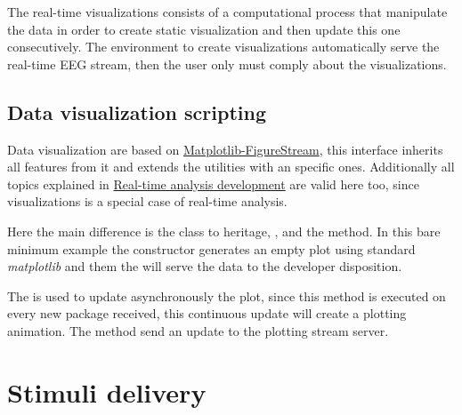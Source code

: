 

The real-time visualizations consists of a computational process that manipulate the data in order to create static visualization and then update this one consecutively. The environment to create visualizations automatically serve the real-time EEG stream, then the user only must comply about the visualizations.


\subsection{Data visualization scripting}\label{ch4:viz_development}%

Data visualization are based on \hyperref[appendix:matplotlib-figurestream]{Matplotlib-FigureStream}, this interface inherits all features from it and extends the utilities with an specific ones. Additionally all topics explained in \hyperref[ch4:data\_analysis]{Real-time analysis development} are valid here too, since visualizations is a special case of real-time analysis.



Here the main difference is the class to heritage, , and the  method. In this bare minimum example the constructor generates an empty plot using standard \textit{matplotlib} and them the  will serve the data to the developer disposition.



The  is used to update asynchronously the plot, since this method is executed on every new package received, this continuous update will create a plotting animation. The  method send an update to the plotting stream server.



\section{Stimuli delivery} %

